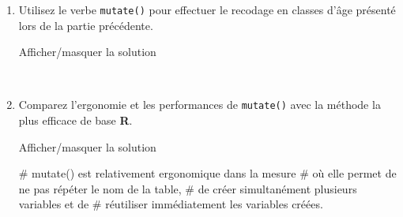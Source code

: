 \documentclass[12pt,]{article}
\newenvironment{Shaded}{}{}
\newcommand{\KeywordTok}[1]{\textcolor[rgb]{0.00,0.00,1.00}{{#1}}}
\newcommand{\DataTypeTok}[1]{{#1}}
\newcommand{\DecValTok}[1]{{#1}}
\newcommand{\StringTok}[1]{\textcolor[rgb]{0.00,0.50,0.50}{{#1}}}
\newcommand{\CommentTok}[1]{\textcolor[rgb]{0.00,0.50,0.00}{{#1}}}
\newcommand{\NormalTok}[1]{{#1}}
\begin{document}
\begin{enumerate}
\def\labelenumi{\alph{enumi}.}
\item
  Utilisez le verbe \texttt{mutate()} pour effectuer le recodage en
  classes d'âge présenté lors de la partie précédente.

  Afficher/masquer la solution

  \hypertarget{sol51}{}
\begin{Shaded}
\end{Shaded}

  ~
\item
  Comparez l'ergonomie et les performances de \texttt{mutate()} avec la
  méthode la plus efficace de base \textbf{R}.

  Afficher/masquer la solution

  \hypertarget{sol52}{}
\begin{Shaded}
\begin{Highlighting}[]
\CommentTok{# mutate() est relativement ergonomique dans la mesure}
\CommentTok{# où elle permet de ne pas répéter le nom de la table,}
\CommentTok{# de créer simultanément plusieurs variables et de }
\CommentTok{# réutiliser immédiatement les variables créées.}


\end{Highlighting}
\end{Shaded}
\end{enumerate}
\end{document}
